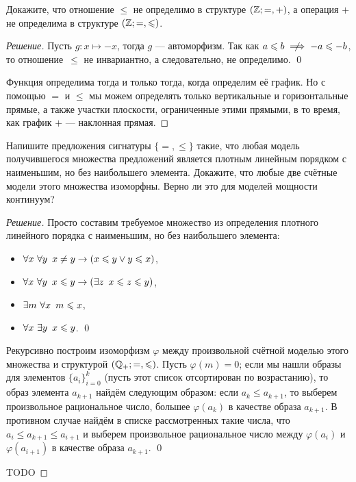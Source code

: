    \begin{problem}[4]
        Докажите, что отношение \(\leqslant\) не определимо в структуре \((\mathbb{Z}; =, +)\), а операция \(+\) не определима в структуре \((\mathbb{Z}; =, \leqslant)\).
    \end{problem}
    \begin{proof}[Решение]
        Пусть \(g \colon x \mapsto -x\), тогда \(g\) --- автоморфизм. Так как \(a \leqslant b \centernot\implies -a \leqslant -b\), то отношение~\(\leqslant\) не инвариантно, а следовательно, не определимо. \qed

        Функция определима тогда и только тогда, когда определим её график. Но с помощью \(=\) и \(\leqslant\) мы можем определять только вертикальные и горизонтальные прямые, а также участки плоскости, ограниченные этими прямыми, в то время, как график \(+\) --- наклонная прямая.
    \end{proof}

    \begin{problem}[5]
        Напишите предложения сигнатуры \(\{=, \leqslant\}\) такие, что любая модель получившегося множества предложений является плотным линейным порядком с наименьшим, но без наибольшего элемента. Докажите, что любые две счётные модели этого множества изоморфны. Верно ли это для моделей мощности континуум?
    \end{problem}
    \begin{proof}[Решение]
        Просто составим требуемое множество из определения плотного линейного порядка с наименьшим, но без наибольшего элемента:
        \begin{itemize}
            \item \(\forall x \ \forall y \enskip x \neq y \to (x \leqslant y \lor y \leqslant x)\),
            \item \(\forall x \ \forall y \enskip x \leqslant y \to (\exists z \enskip x \leqslant z \leqslant y)\),
            \item \(\exists m \ \forall x \enskip m \leqslant x\),
            \item \(\forall x \ \exists y \enskip x \leqslant y\). \qed
        \end{itemize}
        
        Рекурсивно построим изоморфизм \(\varphi\) между произвольной счётной моделью этого множества и структурой \((\mathbb{Q}_+; =, \leqslant)\). Пусть \(\varphi(m) = 0\); если мы нашли образы для элементов \(\{a_i\}_{i=0}^k\) (пусть этот список отсортирован по возрастанию), то образ элемента \(a_{k+1}\) найдём следующим образом: если \(a_k \leqslant a_{k+1}\), то выберем произвольное рациональное число, большее \(\varphi(a_k)\) в качестве образа \(a_{k+1}\). В противном случае найдём в списке рассмотренных такие числа, что \(a_i \leqslant a_{k+1} \leqslant a_{i+1}\) и выберем произвольное рациональное число между \(\varphi(a_i)\) и \(\varphi(a_{i+1})\) в качестве образа \(a_{k+1}\). \qed

        TODO
    \end{proof}
